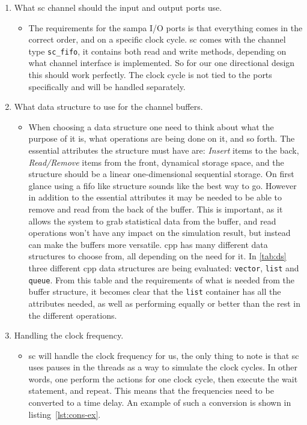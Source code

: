 \documentclass[a4paper, 12pt]{report}
\newcommand{\codeword}[1]{\texttt{#1}}
\begin{document}
\begin{enumerate}
	\item What \gls{sc} channel should the input and output ports use.
	
		\begin{itemize}
		\item The requirements for the \gls{sampa} I/O ports is that everything comes in the correct order, and on a specific clock cycle.
		\gls{sc} comes with the channel type \codeword{sc\_fifo}, it contains both read and write methods, depending on what channel interface is implemented.
		So for our one directional design this should work perfectly.
		The clock cycle is not tied to the ports specifically and will be handled separately.
		\end{itemize}	
		
	\item What data structure to use for the channel buffers.
		\begin{itemize}
\item When choosing a data structure one need to think about what the purpose of it is, what operations are being done on it, and so forth.
		The essential attributes the structure must have are: \textit{Insert} items to the back, \textit{Read/Remove} items from the front, dynamical storage space, and the structure should be a linear one-dimensional sequential storage.
		On first glance using a \gls{fifo} like structure sounds like the best way to go.
		However in addition to the essential attributes it may be needed to be able to remove and read from the back of the buffer.
		This is important, as it allows the system to grab statistical data from the buffer, and read operations won't have any impact on the simulation result, but instead can make the buffers more versatile.
		\gls{cpp} has many different data structures to choose from, all depending on the need for it.		
		In \ref{tab:ds} three different \gls{cpp} data structures are being evaluated: \codeword{vector}, \codeword{list} and \codeword{queue}.
		From this table and the requirements of what is needed from the buffer structure, it becomes clear that the \codeword{list} container has all the attributes needed, as well as performing equally or better than the rest in the different operations.
\end{itemize}
	\item Handling the clock frequency.
		\begin{itemize}
		\item \gls{sc} will handle the clock frequency for us, the only thing to note is that \gls{sc} uses pauses in the threads as a way to simulate the clock cycles.
		In other words, one perform the actions for one clock cycle, then execute the wait statement, and repeat.
		This means that the frequencies need to be converted to a time delay.	
		An example of such a conversion is shown in listing~\ref{lst:cons-ex}.
		\end{itemize}	
	
\end{enumerate}
\end{document}
